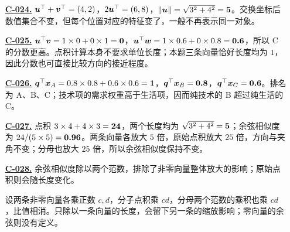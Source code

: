 \begin{enumerate}[label={},leftmargin=4.8em,itemsep=4pt]
\item[\textbf{\hyperref[exercise:vector-coordinate-operations]{C-024.}}] \leavevmode{}\label{solution:C-024}\label{solution:vector-coordinate-operations}$\boldsymbol{u}^\top+\boldsymbol{v}^\top=(4,2)$，$2\boldsymbol{u}^\top=(6,8)$，$\|\boldsymbol{u}\|=\sqrt{3^2+4^2}=\boldsymbol{5}$。交换坐标后数值集合不变，但每个位置对应的特征变了，一般不再表示同一对象。
\item[\textbf{\hyperref[exercise:unit-vector-dot-comparison]{C-025.}}] \leavevmode{}\label{solution:C-025}\label{solution:unit-vector-dot-comparison}$\boldsymbol{u}^\top\boldsymbol{v}=1\times0+0\times1=\boldsymbol{0}$，$\boldsymbol{u}^\top\boldsymbol{w}=1\times0.6+0\times0.8=\boldsymbol{0.6}$，所以 C 的分数更高。点积计算本身不要求单位长度；本题三条向量恰好长度均为 $1$，因此分数也可直接比较方向的接近程度。
\item[\textbf{\hyperref[exercise:article-query-ranking]{C-026.}}] \leavevmode{}\label{solution:C-026}\label{solution:article-query-ranking}$\boldsymbol{q}^\top\boldsymbol{x}_A=0.8\times0.8+0.6\times0.6=\boldsymbol{1}$，$\boldsymbol{q}^\top\boldsymbol{x}_B=\boldsymbol{0.8}$，$\boldsymbol{q}^\top\boldsymbol{x}_C=\boldsymbol{0.6}$。排名为 A、B、C；技术项的需求权重高于生活项，因而纯技术的 B 超过纯生活的 C。
\item[\textbf{\hyperref[exercise:cosine-rescaling]{C-027.}}] \leavevmode{}\label{solution:C-027}\label{solution:cosine-rescaling}点积 $3\times4+4\times3=\boldsymbol{24}$，两个长度均为 $\sqrt{3^2+4^2}=\boldsymbol{5}$；余弦相似度为 $24/(5\times5)=\boldsymbol{0.96}$。两条向量各放大 $5$ 倍，原始点积放大 $25$ 倍，方向与夹角不变；分母也放大 $25$ 倍，所以余弦相似度保持不变。
\item[\textbf{\hyperref[exercise:cosine-length-control]{C-028.}}] \leavevmode{}\label{solution:C-028}\label{solution:cosine-length-control}余弦相似度除以两个范数，排除了非零向量整体放大的影响；原始点积则会随长度变化。\par 设两条非零向量各乘正数 $c,d$，分子点积乘 $cd$，分母两个范数的乘积也乘 $cd$，比值相消。只除以一条向量的长度，会留下另一条的缩放影响；零向量的余弦则没有定义。
\end{enumerate}
